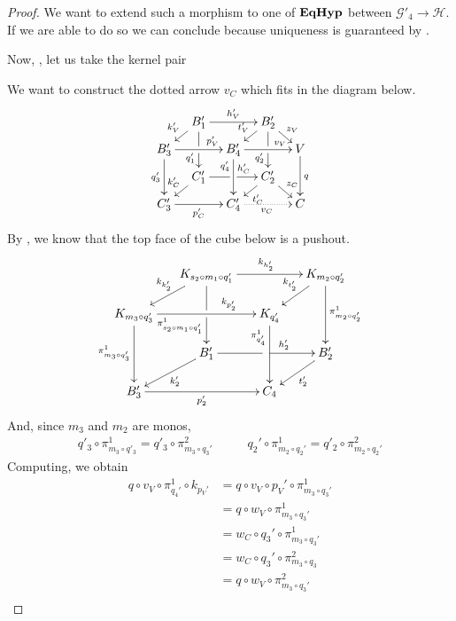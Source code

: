 \documentclass[a4paper,UKenglish,cleveref,pdftex,thm-restate,numberwithinsect]{lipics-v2021}
\def\B{\textbf {\textup{B}}}
\newcommand{\catname}[1]{\textbf{\textup{#1}}}
\newcommand{\EqHyp}{\catname{EqHyp}} %
\begin{document}
\begin{proof}
	We want to extend such a morphism to one of $\EqHyp$ between $\mathcal{G}'_4\to \mathcal{H}$. If we are able to do so we can conclude because uniqueness is guaranteed by . 
	
	Now, , let us take the kernel pair
	
	
	
	
	
	
	We want to construct the dotted arrow $v_C$ which fits in the diagram below.
	\[
	\xymatrix@C=10pt@R=6pt{
		&B_1'\ar[dd]|\hole_(.65){q_1'}\ar[rr]^{h_V'} \ar[dl]_{k_V'} && B_2' \ar[dd]|\hole_(.65){q_2'} \ar[dl]_{t_V'}\ar[dr]^{z_V}\\
		B_3'  \ar[dd]_{q_3'}\ar[rr]^(.7){p_V'} & & B_4' \ar[dd]_(.3){q_4'} \ar[rr]^(.7){v_V}&&  V\ar[dd]^{q}\\
		&C_1'\ar[rr]|\hole^(.65){h_C'} \ar[dl]_{k_C'} && C_2' \ar[dl]^{t_C'}\ar[dr]^{z_C}\\
		C'_3 \ar[rr]_{p_C'} & & C'_4\ar@{.>}[rr]_{v_C} && C
	}\]
	By , we know that the top face of the cube below is a pushout.
	\[\xymatrix@C=15pt@R=15pt{&K_{s_2\circ m_1\circ q'_1}\ar[dd]|\hole_(.65){\pi_{s_2\circ m_1\circ q'_1}^{1}}\ar[rr]^{k_{h'_2}} \ar[dl]_{k_{k'_2}} && K_{m_2\circ q'_2} \ar[dd]^{\pi_{m_2\circ q'_2}^{1}} \ar[dl]_{k_{t'_2}} \\ K_{m_3\circ q'_3}  \ar[dd]_{\pi_{m_3\circ q'_3}^{1}}\ar[rr]^(.7){k_{p'_2}} & & K_{q'_4} \ar[dd]_(.3){\pi_{q'_4}^{1}}\\&B'_1\ar[rr]|\hole^(.65){h'_2} \ar[dl]^{k'_2} && B'_2 \ar[dl]^{t'_2} \\B'_3 \ar[rr]_{p'_2} & & C_4}\]
	And, since $m_3$ and $m_2$ are monos,
	\[\begin{split}
		q'_3 \circ \pi_{m_3 \circ q'_3}^1 = q'_3 \circ \pi_{m_3\circ q_3'}^2
	\end{split}\qquad\begin{split}
		q_2' \circ \pi_{m_2 \circ q_2'}^1 = q'_2 \circ \pi_{m_2 \circ q_2'}^2
	\end{split}\]
	Computing, we obtain
	\[\begin{split}
		q \circ v_V \circ \pi_{q_4'}^1 \circ k_{p_V'} &= q \circ v_V \circ p_V' \circ \pi_{m_3 \circ q_3'}^1 \\
		&= q \circ w_V \circ \pi_{m_3 \circ q_3'}^1 \\
		&= w_C \circ q_3' \circ \pi_{m_3 \circ q_3'}^1 \\
		&= w_C \circ q_3' \circ \pi_{m_3 \circ q_3}^2 \\
		&= q \circ w_V \circ \pi_{m_3 \circ q_3'}^2 \\

\end{split}\]
\end{proof}
\end{document}
